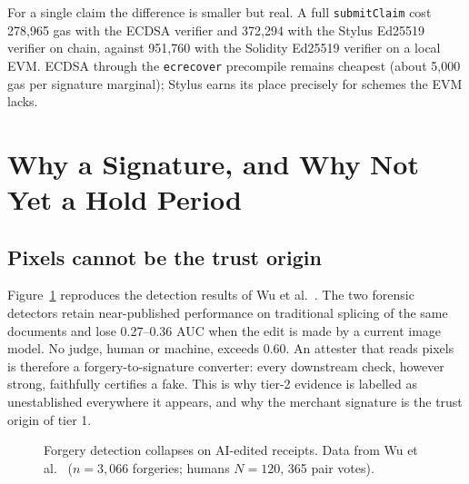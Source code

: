 \documentclass[10.5pt,letterpaper]{article}
\theoremstyle{definition}
\theoremstyle{remark}
\newcommand{\ttt}[1]{\texttt{#1}}
\begin{document}
For a single claim the difference is smaller but real. A full \ttt{submitClaim} cost 278{,}965 gas with the ECDSA
verifier and 372{,}294 with the Stylus Ed25519 verifier on chain, against 951{,}760 with the Solidity Ed25519 verifier on
a local EVM. ECDSA through the \ttt{ecrecover} precompile remains cheapest (about 5{,}000 gas per signature
marginal); Stylus earns its place precisely for schemes the EVM lacks.

\section{Why a Signature, and Why Not Yet a Hold Period}\label{sec:econ}

\subsection{Pixels cannot be the trust origin}
Figure~\ref{fig:forensics} reproduces the detection results of Wu et al.~\cite{wu2026forger}. The two forensic detectors retain
near-published performance on traditional splicing of the same documents and lose 0.27--0.36 AUC when the edit is made by
a current image model. No judge, human or machine, exceeds 0.60. An attester that reads pixels is therefore a
forgery-to-signature converter: every downstream check, however strong, faithfully certifies a fake. This is why tier-2
evidence is labelled as unestablished everywhere it appears, and why the merchant signature is the trust origin of tier 1.

\begin{figure}[!htb]
\centering
{}
\caption{Forgery detection collapses on AI-edited receipts. Data from Wu et al.~\cite{wu2026forger} ($n=3{,}066$ forgeries; humans $N=120$, 365 pair votes).}
\label{fig:forensics}
\end{figure}
\end{document}
